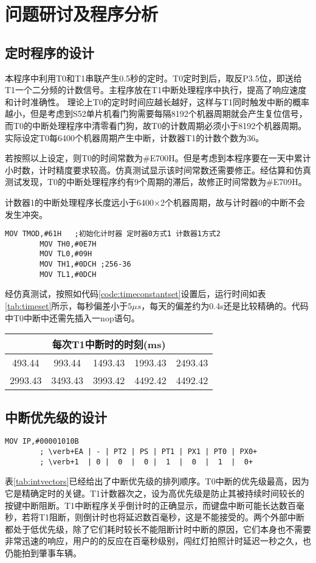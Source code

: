 \section{问题研讨及程序分析}
\subsection{定时程序的设计} \label{sec:timeprog}
本程序中利用T0和T1串联产生0.5秒的定时。T0定时到后，取反P3.5位，即送给T1一个二分频的计数信号。主程序放在T1中断处理程序中执行，提高了响应速度和计时准确性。
理论上T0的定时时间应越长越好，这样与T1同时触发中断的概率越小，但是考虑到S52单片机看门狗需要每隔8192个机器周期就会产生复位信号，而T0的中断处理程序中清零看门狗，故T0的计数周期必须小于8192个机器周期。实际设定T0每6400个机器周期产生中断，计数器T1的计数个数为36。

若按照以上设定，则T0的时间常数为\#E700H。但是考虑到本程序要在一天中累计小时数，计时精度要求较高。仿真测试显示该时间常数还需要修正。经估算和仿真测试发现，T0的中断处理程序约有9个周期的滞后，故修正时间常数为\#E709H。

计数器1的中断处理程序长度远小于6400×2个机器周期，故与计时器0的中断不会发生冲突。

\begin{lstlisting}[language={[x86masm]assembler},escapeinside="",caption={时间常数设置},label=code:timeconstantset] 
		MOV TMOD,#61H	;初始化计时器 定时器0方式1 计数器1方式2
		MOV TH0,#0E7H	
		MOV TL0,#09H	
		MOV TH1,#0DCH ;256-36
		MOV TL1,#0DCH
\end{lstlisting} 
经仿真测试，按照如代码\ref{code:timeconstantset}设置后，运行时间如表\ref{tab:timeset}所示，每秒偏差小于$5\mu s$，每天的偏差约为0.4s还是比较精确的。代码中T0中断中还需先插入一nop语句。
\begin{table}[!htpb]
      	\centering
      	\begin{tabular}{ccccc} \toprule
       		\multicolumn{5}{c}{每次T1中断时的时刻(ms)} \\ \hline
       		493.44& 993.44&1493.43&1993.43&2493.43 \\ 
       		2993.43&3493.43&3993.42&4492.42&4492.42 \\ \bottomrule
      	\end{tabular}
		\end{table}
\subsection{中断优先级的设计} \label{sec:intstudy}
\begin{lstlisting}[language={[x86masm]assembler},escapeinside="",caption={中断优先级设置}] 
		MOV IP,#00001010B  
		; \verb+EA | - | PT2 | PS | PT1 | PX1 | PT0 | PX0+
		; \verb+1  | 0 |  0  |  0 |  1  |  0  |  1  |  0+
\end{lstlisting} 
表\ref{tab:intvectors}已经给出了中断优先级的排列顺序。T0中断的优先级最高，因为它是精确定时的关键。T1计数器次之，设为高优先级是防止其被持续时间较长的按键中断阻断。T1中断程序关乎倒计时的正确显示，而键盘中断可能长达数百毫秒，若将T1阻断，则倒计时也将延迟数百毫秒，这是不能接受的。两个外部中断都处于低优先级，除了它们耗时较长不能阻断计时中断的原因，它们本身也不需要非常迅速的响应，用户的的反应在百毫秒级别，闯红灯拍照计时延迟一秒之久，也仍能拍到肇事车辆。
